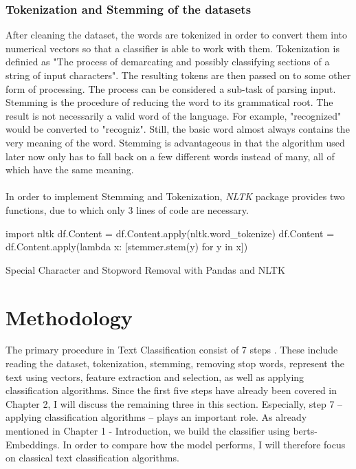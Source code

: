 \documentclass[a4paper, 11pt,titlepage,oneside,openany]{book}
\begin{document}
\subsection{Tokenization and Stemming of the datasets}
After cleaning the dataset, the words are tokenized in order to convert them into numerical vectors so that a classifier is able to work with them. Tokenization is definied as "The process of demarcating and possibly classifying sections of a string of input characters". The resulting tokens are then passed on to some other form of processing. The process can be considered a sub-task of parsing input.\\
\noindent Stemming is the procedure of reducing the word to its grammatical root. The result is not necessarily a valid word of the language. For example, "recognized" would be converted to "recogniz". Still, the basic word almost always contains the very meaning of the word. Stemming is advantageous in that the algorithm used later now only has to fall back on a few different words instead of many, all of which have the same meaning.\\
\\
\noindent In order to implement Stemming and Tokenization, \textit{NLTK} \cite{nltk} package provides two functions, due to which only 3 lines of code are necessary.\\

\begin{algorithm}[H]
	\DontPrintSemicolon
	import nltk\;
	df.Content = df.Content.apply(nltk.word\_tokenize)\;
	df.Content = df.Content.apply(lambda x: [stemmer.stem(y) for y in x])\;
	\caption{Special Character and Stopword Removal with Pandas and NLTK}
\end{algorithm}

\chapter{Methodology}
The primary procedure in Text Classification consist of 7 steps \cite{textclassification}. These include  reading the dataset, tokenization, stemming, removing stop words, represent the text using vectors, feature extraction and selection, as well as applying classification algorithms. Since the first five steps have already been covered in Chapter 2, I will discuss the remaining three in this section. Especially, step 7 -- applying classification algorithms -- plays an important role. As already mentioned in Chapter 1 - Introduction, we build the classifier using \glspl{bert}-Embeddings. In order to compare how the model performs, I will therefore focus on classical text classification algorithms.
\end{document}
